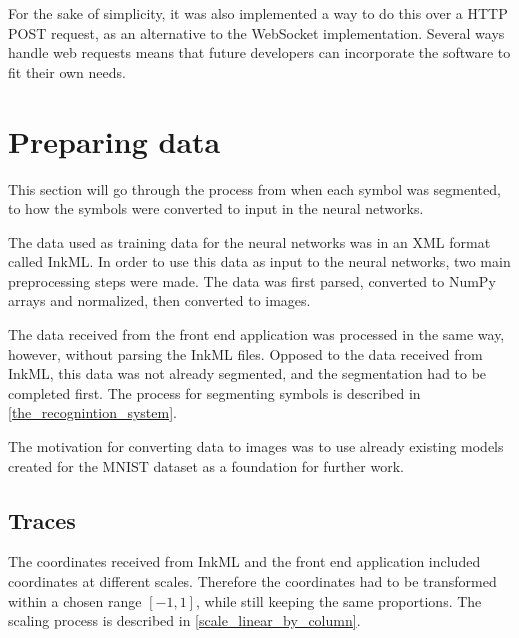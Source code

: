 For the sake of simplicity, it was also implemented a way to do this over a HTTP POST request, as an alternative to the WebSocket implementation. Several ways handle web requests means that future developers can incorporate the software to fit their own needs.


\section{Preparing data}
This section will go through the process from when each symbol was segmented, to how the symbols were converted to input in the neural networks.

The data used as training data for the neural networks was in an XML format called InkML. In order to use this data as input to the neural networks, two main preprocessing steps were made. The data was first parsed, converted to NumPy arrays and normalized, then converted to images.

The data received from the front end application was processed in the same way, however, without parsing the InkML files. Opposed to the data received from InkML, this data was not already segmented, and the segmentation had to be completed first. The process for segmenting symbols is described in \ref{the_recognintion_system}.

The motivation for converting data to images was to use already existing models created for the MNIST dataset as a foundation for further work.

\subsection{Traces}
\label{preparing_data_traces}
The coordinates received from InkML and the front end application included coordinates at different scales. Therefore the coordinates had to be transformed within a chosen range $[-1, 1]$, while still keeping the same proportions. The scaling process is described in \ref{scale_linear_by_column}.

